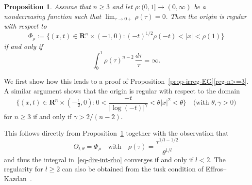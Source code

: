 \documentclass[a4paper, twoside]{article}
\makeatletter
\theoremstyle{propositional}
\newtheorem{prop}[thm]{Proposition}
\theoremstyle{descriptive}
\renewenvironment{proof}[1][\proofname]{\par
  \pushQED{\qed}%
  \normalfont
  \trivlist
  \item[\hskip\labelsep
        \itshape
    #1\@addpunct{.}]\ignorespaces
}{%
  \popQED\endtrivlist\@endpefalse
}
\numberwithin{equation}{section}
\newcommand{\R}{\mathbf{R}}
\newcommand{\ga}{\gamma}
\makeatother
\begin{document}
\begin{prop} \label{prop-Phi-rho}
Assume that $n\ge 3$ 
and let $\rho:(0,1]\to (0,\infty)$ be a nondecreasing function such that
$\lim_{\tau\to 0+} \rho(\tau) = 0$.
Then the origin is regular with respect to 
\begin{equation*} %
\Phi_{\rho} := \{(x,t) \in \R^{n} \times (-1,0): 
(-t)^{1/2} \rho(-t) <|x| < \rho(1)\}
\end{equation*}
if and only if 
\begin{equation}    \label{eq-div-int-rho}
\int_0^1 \rho(\tau)^{n-2} \, \frac{d\tau}{\tau} = \infty.
\end{equation}
\end{prop}

We first show 
how this leads to a proof of Proposition~\ref{prop-irreg-EG}\ref{reg-n>=3}.
A similar argument shows that the origin is regular with respect to the domain
\[
\biggl\{(x,t) \in \R^{n} \times (-\tfrac12,0): 
    0<\frac{-t}{| {\log(-t)} |^{\ga}} < \theta |x|^2 <\theta \biggr\}
    \quad \text{(with $\theta,\ga>0$)}
\]
for $n\ge3$ if and only if $\ga > 2/(n-2)$.


\begin{proof}[Proof of Proposition~\ref{prop-irreg-EG}\ref{reg-n>=3}]
This follows directly from Proposition~\ref{prop-Phi-rho} 
together with the observation that 
\[
\Theta_{l,\theta} = \Phi_{\rho} \quad \text{with} \quad
\rho(\tau) = \frac{\tau^{1/l-1/2}}{\theta^{1/l}}
\]
and thus the integral in~\eqref{eq-div-int-rho} converges if and only if $l<2$.
The regularity for $l \ge 2$ can also be obtained  from the tusk condition 
of Effros--Kazdan~\cite{EfKaz}.
\end{proof}
\end{document}
